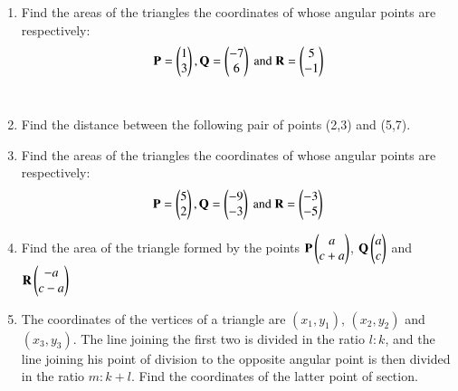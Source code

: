 \renewcommand{\theequation}{\theenumi}
\renewcommand{\thefigure}{\theenumi}
\begin{enumerate}[label=\thesubsection.\arabic*.,ref=\thesubsection.\theenumi]
\item     Find the areas of the triangles the coordinates of
    whose angular points are respectively: 
%
\begin{align}
\Vec{P} =\myvec{1 \\3 }, \Vec{Q} =\myvec{- 7\\ 6 }\text{ and } \Vec{R} =\myvec{5 \\-1 }
\end{align}	
\\
\solution


\item Find the distance between the following pair of points (2,3) and (5,7). 
\\
\solution
%

\item Find the areas of the triangles the coordinates of
    whose angular points are respectively: 
\begin{equation}
\Vec{P} =\myvec{5 \\2 }, \Vec{Q} =\myvec{- 9\\ -3 }\text{ and } \Vec{R} =\myvec{-3 \\-5}\\
\end{equation}
%
\solution

\item Find the area of the triangle formed by the points $ \mathbf{P} \begin{pmatrix}a\\c+a\end{pmatrix}$, $\mathbf{Q} \begin{pmatrix}a\\c\end{pmatrix}$ and $\mathbf{R} \begin{pmatrix}-a\\c-a\end{pmatrix}$
\\
\solution


\item The coordinates of the vertices of a triangle are $(x_1,y_1)$, $(x_2,y_2)$ and $(x_3,y_3)$. The line joining the first two is divided in the ratio $l:k$, and the line joining his point of division to the opposite angular point is then divided in the ratio  $m:k+l$. Find the coordinates of the latter point of section. 
%
\\
\solution


\end{enumerate}
